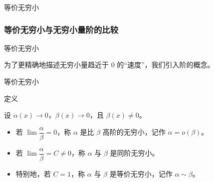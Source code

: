 \documentclass[aspectratio=169,10pt,fontset=fandol]{ctexbeamer}
\newenvironment{custom}[1]{\par\noindent\textbf{#1}\quad}{\par\vspace{0.8em}}
\begin{document}
\begin{frame}[t,fragile]{等价无穷小}
\normalsize
{\normalsize
\subsubsection{等价无穷小与无穷小量阶的比较}


}
\end{frame}
\begin{frame}[t,fragile]{等价无穷小}
\normalsize
{\normalsize
为了更精确地描述无穷小量趋近于 0 的“速度”，我们引入阶的概念。


}
\end{frame}
\begin{frame}[t,fragile]{等价无穷小}
\normalsize
\begin{block}{定义}
{\normalsize

设 \(\alpha(x) \to 0\)，\(\beta(x) \to 0\)，且 \(\beta(x) \neq 0\)。
\begin{itemize}
\item 若 \(\lim \dfrac{\alpha}{\beta} = 0\)，称 \(\alpha\) 是比 \(\beta\) 高阶的无穷小，记作 \(\alpha = o(\beta)\)。
\item 若 \(\lim \dfrac{\alpha}{\beta} = C \neq 0\)，称 \(\alpha\) 与 \(\beta\) 是同阶无穷小。
\item 特别地，若 \(C = 1\)，称 \(\alpha\) 与 \(\beta\) 是等价无穷小，记作 \(\alpha \sim \beta\)。
\end{itemize}

}
\end{block}
\end{frame}
\end{document}
